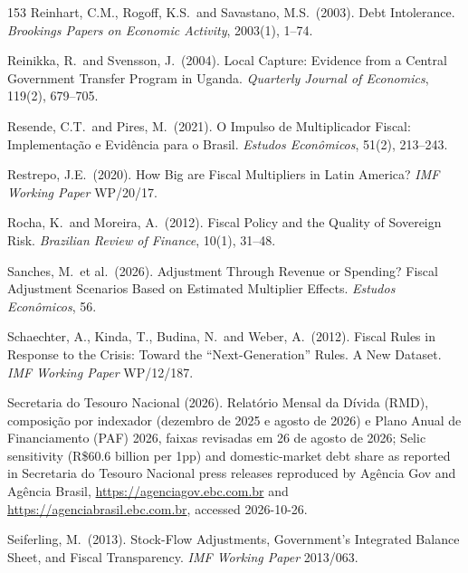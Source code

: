 \documentclass[11pt,a4paper]{article}
\begin{document}
\begin{thebibliography}{153}
 Reinhart, C.M., Rogoff, K.S.\ and Savastano, M.S.\ (2003). Debt Intolerance. \textit{Brookings Papers on Economic Activity}, 2003(1), 1--74.

 Reinikka, R.\ and Svensson, J.\ (2004). Local Capture: Evidence from a Central Government Transfer Program in Uganda. \textit{Quarterly Journal of Economics}, 119(2), 679--705.

 Resende, C.T.\ and Pires, M.\ (2021). O Impulso de Multiplicador Fiscal: Implementa\c{c}\~ao e Evid\^encia para o Brasil. \textit{Estudos Econ\^omicos}, 51(2), 213--243.

 Restrepo, J.E.\ (2020). How Big are Fiscal Multipliers in Latin America? \textit{IMF Working Paper} WP/20/17.

 Rocha, K.\ and Moreira, A.\ (2012). Fiscal Policy and the Quality of Sovereign Risk. \textit{Brazilian Review of Finance}, 10(1), 31--48.

 Sanches, M.\ et al.\ (2026). Adjustment Through Revenue or Spending? Fiscal Adjustment Scenarios Based on Estimated Multiplier Effects. \textit{Estudos Econ\^omicos}, 56.

 Schaechter, A., Kinda, T., Budina, N.\ and Weber, A.\ (2012). Fiscal Rules in Response to the Crisis: Toward the ``Next-Generation'' Rules. A New Dataset. \textit{IMF Working Paper} WP/12/187.

 Secretaria do Tesouro Nacional (2026). Relat\'orio Mensal da D\'ivida (RMD), composi\c{c}\~ao por indexador (dezembro de 2025 e agosto de 2026) e Plano Anual de Financiamento (PAF) 2026, faixas revisadas em 26 de agosto de 2026; Selic sensitivity (R\$60.6 billion per 1pp) and domestic-market debt share as reported in Secretaria do Tesouro Nacional press releases reproduced by Ag\^encia Gov and Ag\^encia Brasil, \url{https://agenciagov.ebc.com.br} and \url{https://agenciabrasil.ebc.com.br}, accessed 2026-10-26.

 Seiferling, M.\ (2013). Stock-Flow Adjustments, Government's Integrated Balance Sheet, and Fiscal Transparency. \textit{IMF Working Paper} 2013/063.


\end{thebibliography}
\end{document}
